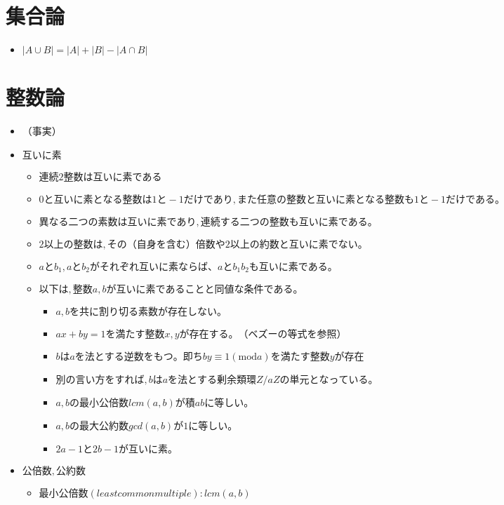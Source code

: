\documentclass[dvipdfmx,uplatex]{jsarticle}
\begin{document}
\section{集合論}
\begin{itemize}
	\item $ |A \cup B| = |A| + |B| - |A \cap B|$
\end{itemize}

\section{整数論}
\begin{itemize}
	\item（事実）
	\item $ 互いに素$
	\begin{itemize}
		\item $ 連続2整数は互いに素である$
		\item $ 0 と互いに素となる整数は 1 と −1 だけであり,また任意の整数と互いに素となる整数も 1 と −1 だけである。$
		\item $ 異なる二つの素数は互いに素であり,連続する二つの整数も互いに素である。$
		\item $ 2 以上の整数は,その（自身を含む）倍数や 2 以上の約数と互いに素でない。$
		\item $ a と b_1,a と b_2 がそれぞれ互いに素ならば、a と b_1b_2 も互いに素である。$
		\item $ 以下は,整数 a, b が互いに素であることと同値な条件である。$
		\begin{itemize}
			\item $ a, b を共に割り切る素数が存在しない。$
			\item $ ax + by = 1 を満たす整数 x, y が存在する。（ベズーの等式を参照）$
			\item $ b は a を法とする逆数をもつ。即ち by \equiv 1 (\mathrm{mod} a) を満たす整数 y が存在$
				\item $別の言い方をすれば,b は a を法とする剰余類環 Z/aZ の単元となっている。$
			\item $ a, b の最小公倍数 lcm(a, b) が積 ab に等しい。$
			\item $ a, b の最大公約数 gcd(a, b) が 1 に等しい。$
			\item $ 2a − 1 と 2b − 1 が互いに素。$
		\end{itemize}
	\end{itemize}
	\item $ 公倍数,公約数$
	\begin{itemize}
		\item $ 最小公倍数(least common multiple): lcm(a,b)$

\end{itemize}
\end{itemize}
\end{document}
